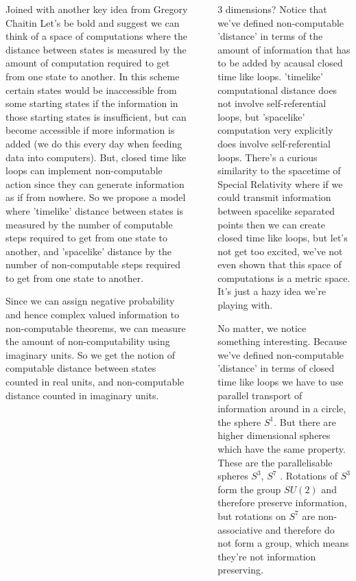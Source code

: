 \documentclass[final]{beamer}
\newlength{\sepwidth}
\newlength{\colwidth}
\newcommand{\separatorcolumn}{\begin{column}{\sepwidth}\end{column}}
\begin{document}
\begin{frame}[t]
\begin{columns}[t]
\begin{column}{\colwidth}
\begin{block}{Joined with another key idea from Gregory Chaitin}
    Let's be bold and suggest we can think of a space of computations where the distance between states is measured by the amount of computation required to get from one state to another. In this scheme certain states would be inaccessible from some starting states if the information in those starting states is insufficient, but can become accessible if more information is added (we do this every day when feeding data into computers). But, closed time like loops can implement non-computable action since they can generate information as if from nowhere. So we propose a model where 'timelike' distance between states is measured by the number of computable steps required to get from one state to another, and 'spacelike' distance by the number of non-computable steps required to get from one state to another. 

    Since we can assign negative probability and hence complex valued information to non-computable theorems, we can measure the amount of non-computability using imaginary units. So we get the notion of computable distance between states counted in real units, and non-computable distance counted in imaginary units. 
\end{block}
\end{column}
\separatorcolumn
\begin{column}{\colwidth}
\begin{block}{3 dimensions?}
    Notice that we've defined non-computable 'distance' in terms of the amount of information that has to be added by acausal closed time like loops. 'timelike' computational distance does not involve self-referential loops, but 'spacelike' computation very explicitly does involve self-referential loops. There's a curious similarity to the spacetime of Special Relativity where if we could transmit information between spacelike separated points then we can create closed time like loops, but let's not get too excited, we've not even shown that this space of computations is a metric space. It's just a hazy idea we're playing with. 
    
    No matter, we notice something interesting. Because we've defined non-computable 'distance' in terms of closed time like loops we have to use parallel transport of information around in a circle, the sphere $S^1$. But there are higher dimensional spheres which have the same property. These are the parallelisable spheres $S^3$, $S^7$ \autocite{baez_2002}. Rotations of $S^3$ form the group $SU(2)$ and therefore preserve information, but rotations on $S^7$ are non-associative and therefore do not form a group, which means they're not information preserving. 


\end{block}
\end{column}
\end{columns}
\end{frame}
\end{document}
